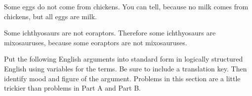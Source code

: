 \begin{exercises}
   \item Some eggs do not come from chickens. You can tell, because no milk comes from chickens, but all eggs are milk.


\item Some ichthyosaurs are not eoraptors. Therefore some ichthyosaurs are mixosauruses, because some eoraptors are not mixosauruses. 
    
\end{exercises}

\noindent\problempart Put the following English arguments into standard form in logically structured English using variables for the terms. Be sure to include a translation key. Then identify mood and figure of the argument. Problems in this section are a little trickier than problems in Part A and Part B. 


